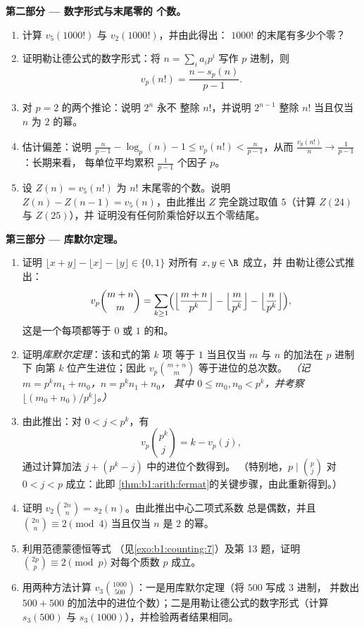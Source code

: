 \begin{problem}
\medskip
\noindent\textbf{第二部分 --- 数字形式与末尾零的
个数。}
\begin{enumerate}[resume]
  \item 计算 $v_5(1000!)$ 与 $v_2(1000!)$，并由此得出：
        $1000!$ 的末尾有多少个零？
  \item 证明勒让德公式的数字形式：将 $n =
        \sum_i a_i p^i$ 写作 $p$ 进制，则
        \[
        v_p(n!) = \frac{n - s_p(n)}{p - 1} .
        \]
  \item 对 $p = 2$ 的两个推论：说明 $2^n$ 永不
        整除 $n!$，并说明 $2^{n-1}$ 整除 $n!$ 当且仅当
        $n$ 为 $2$ 的幂。
  \item 估计偏差：说明 $\frac n{p-1} - \log_p(n) - 1 \leq
        v_p(n!) < \frac n{p-1}$，从而 $\frac{v_p(n!)}{n} \to
        \frac1{p-1}$：长期来看，
        每单位平均累积 $\frac1{p-1}$ 个因子 $p$。
  \item 设 $Z(n) = v_5(n!)$ 为
        $n!$ 末尾零的个数。说明 $Z(n) - Z(n-1) = v_5(n)$，由此推出 $Z$
        完全跳过取值 $5$（计算 $Z(24)$ 与 $Z(25)$），并
        证明没有任何阶乘恰好以五个零结尾。
\end{enumerate}

\medskip
\noindent\textbf{第三部分 --- 库默尔定理。}
\begin{enumerate}[resume]
  \item 证明 $\lfloor x + y \rfloor - \lfloor x \rfloor -
        \lfloor y \rfloor \in \{0, 1\}$ 对所有 $x, y \in \R$ 成立，并
        由勒让德公式推出：
        \[
        v_p\binom{m+n}m
        = \sum_{k\geq1}\Bigl(
        \Bigl\lfloor\frac{m+n}{p^k}\Bigr\rfloor
        - \Bigl\lfloor\frac{m}{p^k}\Bigr\rfloor
        - \Bigl\lfloor\frac{n}{p^k}\Bigr\rfloor\Bigr),
        \]
        这是一个每项都等于 $0$ 或 $1$ 的和。
  \item 证明\emph{库默尔定理}：该和式的第 $k$ 项
        等于 $1$ 当且仅当 $m$ 与 $n$ 的加法在 $p$ 进制下
        向第 $k$ 位产生进位；因此
        $v_p\binom{m+n}m$ 等于进位的总次数。
        \emph{（记 $m = p^km_1 + m_0$，$n = p^kn_1 + n_0$，
        其中 $0 \leq m_0, n_0 < p^k$，并考察 $\lfloor (m_0 +
        n_0)/p^k \rfloor$。）}
  \item 由此推出：对 $0 < j < p^k$，有
        \[
        v_p\binom{p^k}{j} = k - v_p(j) ,
        \]
        通过计算加法 $j + (p^k - j)$ 中的进位个数得到。
        （特别地，$p \mid \binom p j$ 对 $0 < j < p$ 成立：此即
        \cref{thm:b1:arith:fermat}的关键步骤，由此重新得到。）
  \item 证明 $v_2\binom{2n}n = s_2(n)$。由此推出中心二项式系数
        总是偶数，并且 $\binom{2n}n \equiv 2 \pmod 4$
        当且仅当 $n$ 是
        $2$ 的幂。
  \item 利用范德蒙德恒等式
        （见\cref{exo:b1:counting:7}）及第 13 题，证明
        $\binom{2p}p \equiv 2 \pmod p$ 对每个质数 $p$ 成立。
  \item 用两种方法计算 $v_3\binom{1000}{500}$：一是用库默尔定理（将 $500$ 写成 $3$ 进制，
        并数出 $500 +
        500$ 的加法中的进位个数）；二是用勒让德公式的数字形式（计算 $s_3(500)$
        与 $s_3(1000)$），并检验两者结果相同。
\end{enumerate}


\end{problem}
